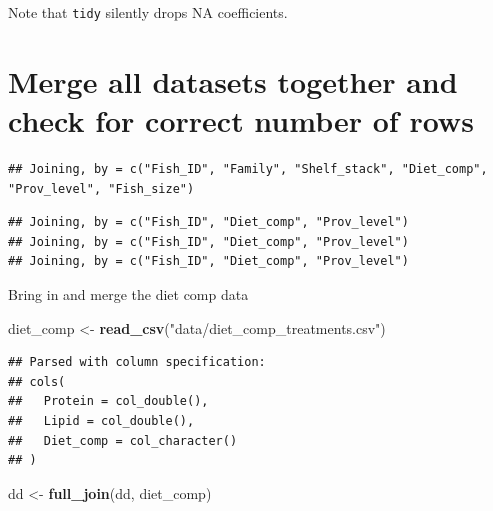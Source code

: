 \documentclass[]{book}
\newenvironment{Shaded}{\begin{snugshade}}{\end{snugshade}}
\newcommand{\KeywordTok}[1]{\textcolor[rgb]{0.13,0.29,0.53}{\textbf{#1}}}
\newcommand{\NormalTok}[1]{#1}
\newcommand{\OperatorTok}[1]{\textcolor[rgb]{0.81,0.36,0.00}{\textbf{#1}}}
\newcommand{\StringTok}[1]{\textcolor[rgb]{0.31,0.60,0.02}{#1}}
\begin{document}
Note that \texttt{tidy} silently drops NA coefficients.

\hypertarget{merge-all-datasets-together-and-check-for-correct-number-of-rows}{%
\section{Merge all datasets together and check for correct number of rows}\label{merge-all-datasets-together-and-check-for-correct-number-of-rows}}

\begin{Shaded}
\end{Shaded}

\begin{verbatim}
## Joining, by = c("Fish_ID", "Family", "Shelf_stack", "Diet_comp", "Prov_level", "Fish_size")
\end{verbatim}

\begin{verbatim}
## Joining, by = c("Fish_ID", "Diet_comp", "Prov_level")
## Joining, by = c("Fish_ID", "Diet_comp", "Prov_level")
## Joining, by = c("Fish_ID", "Diet_comp", "Prov_level")
\end{verbatim}

Bring in and merge the diet comp data

\begin{Shaded}
\begin{Highlighting}[]
\NormalTok{diet_comp <-}\StringTok{ }\KeywordTok{read_csv}\NormalTok{(}\StringTok{"data/diet_comp_treatments.csv"}\NormalTok{)}
\end{Highlighting}
\end{Shaded}

\begin{verbatim}
## Parsed with column specification:
## cols(
##   Protein = col_double(),
##   Lipid = col_double(),
##   Diet_comp = col_character()
## )
\end{verbatim}

\begin{Shaded}
\begin{Highlighting}[]
\NormalTok{dd <-}\StringTok{ }\KeywordTok{full_join}\NormalTok{(dd, diet_comp)}
\end{Highlighting}
\end{Shaded}
\end{document}
